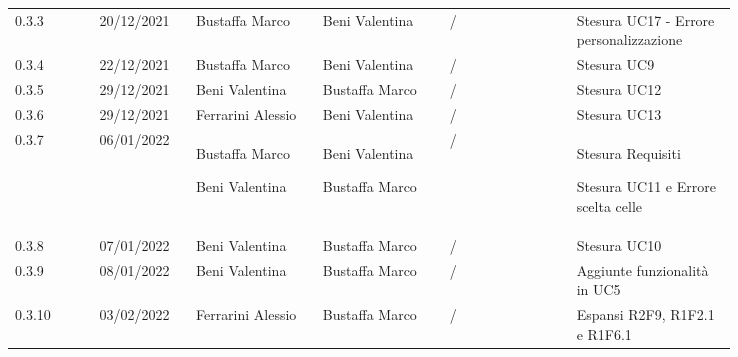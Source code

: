 {\begin{tabular}{p{0.10\linewidth}p{0.10\linewidth}p{0.15\linewidth}p{0.15\linewidth}p{0.15\linewidth}p{0.19\linewidth}}
	\rowcolor[RGB]{216, 235, 171}
	0.3.3 & 20/12/2021 & Bustaffa Marco& Beni Valentina &/& Stesura UC17 - Errore personalizzazione\\
	\rowcolor[RGB]{233, 245, 206}
	0.3.4 & 22/12/2021 & Bustaffa Marco& Beni Valentina &/& Stesura UC9\\
	\rowcolor[RGB]{216, 235, 171}
	0.3.5 & 29/12/2021 & Beni Valentina& Bustaffa Marco &/& Stesura UC12\\
	\rowcolor[RGB]{233, 245, 206}
	0.3.6 & 29/12/2021 & Ferrarini Alessio& Beni Valentina &/& Stesura UC13\\
	\rowcolor[RGB]{216, 235, 171}
	0.3.7 & 06/01/2022 & Bustaffa Marco \par Beni Valentina & Beni Valentina \par Bustaffa Marco & /& Stesura Requisiti \par Stesura UC11 e Errore scelta celle\\
	\rowcolor[RGB]{233, 245, 206}
	0.3.8 & 07/01/2022 & Beni Valentina& Bustaffa Marco &/& Stesura UC10\\
	\rowcolor[RGB]{216, 235, 171}
	0.3.9 & 08/01/2022 & Beni Valentina& Bustaffa Marco &/& Aggiunte funzionalità in UC5\\
	\rowcolor[RGB]{216, 235, 171}
	0.3.10 & 03/02/2022 & Ferrarini Alessio & Bustaffa Marco &/& Espansi R2F9, R1F2.1 e R1F6.1\\
\end{tabular}
}
